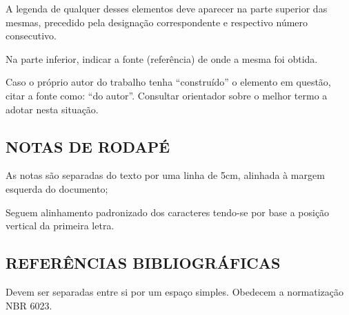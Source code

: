 A legenda de qualquer desses elementos deve aparecer na parte superior das mesmas, precedido pela designação correspondente e respectivo número consecutivo. 

Na parte inferior, indicar a fonte (referência) de onde a mesma foi obtida.

Caso o próprio autor do trabalho tenha “construído” o elemento em questão, citar a fonte como: “do autor”. Consultar orientador sobre o melhor termo a adotar nesta situação.

\subsection{NOTAS DE RODAPÉ}

As notas são separadas do texto por uma linha de 5cm, alinhada à margem esquerda do documento;

Seguem alinhamento padronizado dos caracteres tendo-se por base a posição vertical da primeira letra.

\subsection{REFERÊNCIAS BIBLIOGRÁFICAS}

Devem ser separadas entre si por um espaço simples. Obedecem a normatização NBR 6023.




